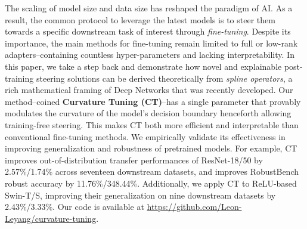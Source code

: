 The scaling of model size and data size has reshaped the paradigm of AI. As a result, the common protocol to leverage the latest models is to steer them towards a specific downstream task of interest through {\em fine-tuning}. Despite its importance, the main methods for fine-tuning remain limited to full or low-rank adapters--containing countless hyper-parameters and lacking interpretability. In this paper, we take a step back and demonstrate how novel and explainable post-training steering solutions can be derived theoretically from {\em spline operators}, a rich mathematical framing of Deep Networks that was recently developed. Our method--coined \textbf{Curvature Tuning (CT)}--has a single parameter that provably modulates the curvature of the model's decision boundary henceforth allowing training-free steering. This makes CT both more efficient and interpretable than conventional fine-tuning methods. We empirically validate its effectiveness in improving generalization and robustness of pretrained models. For example, CT improves out-of-distribution transfer performances of ResNet-18/50 by 2.57\%/1.74\% across seventeen downstream datasets, and improves RobustBench robust accuracy by 11.76\%/348.44\%. Additionally, we apply CT to ReLU-based Swin-T/S, improving their generalization on nine downstream datasets by 2.43\%/3.33\%. Our code is available at \href{https://github.com/Leon-Leyang/curvature-tuning}{https://github.com/Leon-Leyang/curvature-tuning}.